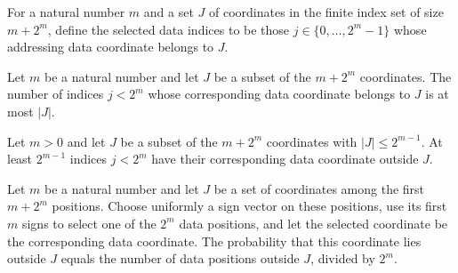 \begin{definition}
\label{FABL.addressingDataIndicesIn}
\leanok
{}
For a natural number $m$ and a set $J$ of coordinates in the finite index set of size
$m+2^m$, define the selected data indices to be those $j\in\{0,\ldots,2^m-1\}$ whose
addressing data coordinate belongs to $J$.
\end{definition}

\begin{theorem}
\label{FABL.card_addressingDataIndicesIn_le}
\leanok
{}
Let $m$ be a natural number and let $J$ be a subset of the $m+2^m$ coordinates. The
number of indices $j<2^m$ whose corresponding data coordinate belongs to $J$ is at most
$|J|$.
\end{theorem}

\begin{theorem}
\label{FABL.card_addressingDataIndicesOutside_ge}
\leanok
{}
Let $m>0$ and let $J$ be a subset of the $m+2^m$ coordinates with $|J|\le 2^{m-1}$. At
least $2^{m-1}$ indices $j<2^m$ have their corresponding data coordinate outside $J$.
\end{theorem}

\begin{theorem}
\label{FABL.uniformProbability_addressingSelectedOutside}
\leanok
{}
Let $m$ be a natural number and let $J$ be a set of coordinates among the first $m+2^m$
positions. Choose uniformly a sign vector on these positions, use its first $m$ signs to
select one of the $2^m$ data positions, and let the selected coordinate be the
corresponding data coordinate. The probability that this coordinate lies outside $J$
equals the number of data positions outside $J$, divided by $2^m$.
\end{theorem}


